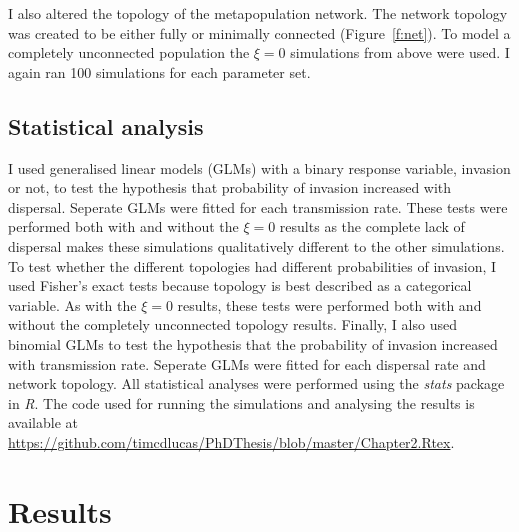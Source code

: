 I also altered the topology of the metapopulation network.
The network topology was created to be either fully or minimally connected (Figure~\ref{f:net}). 
To model a completely unconnected population the $\xi = 0$ simulations from above were used.
I again ran 100 simulations for each parameter set.



\subsection{Statistical analysis}

I used generalised linear models (GLMs) with a binary response variable, invasion or not, to test the hypothesis that probability of invasion increased with dispersal.
Seperate GLMs were fitted for each transmission rate.
These tests were performed both with and without the $\xi = 0$ results as the complete lack of dispersal makes these simulations qualitatively different to the other simulations.
To test whether the different topologies had different probabilities of invasion, I used Fisher's exact tests because topology is best described as a categorical variable.
As with the $\xi = 0$ results, these tests were performed both with and without the completely unconnected topology results.
Finally, I also used binomial GLMs to test the hypothesis that the probability of invasion increased with transmission rate.
Seperate GLMs were fitted for each dispersal rate and network topology.
All statistical analyses were performed using the \emph{stats} package in \emph{R}.
The code used for running the simulations and analysing the results is available at \url{https://github.com/timcdlucas/PhDThesis/blob/master/Chapter2.Rtex}.




\section{Results}












































